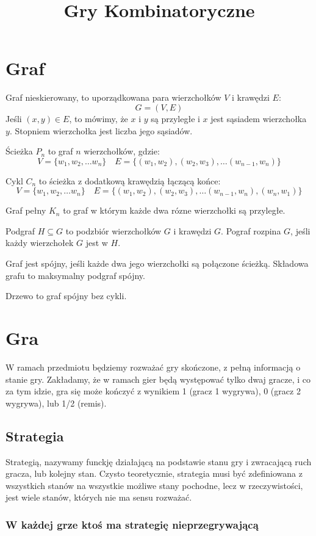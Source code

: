 \documentclass{../notatki}
\title{Gry Kombinatoryczne}
\begin{document}
\section{Graf}

Graf nieskierowany, to uporządkowana para wierzchołków $V$ i krawędzi $E$:
$$
G = (V, E)
$$
Jeśli $(x, y) \in E$, to mówimy, że $x$ i $y$ są przyległe i $x$ jest sąsiadem
wierzchołka $y$.
Stopniem wierzchołka jest liczba jego sąsiadów.

Ścieżka $P_n$ to graf $n$ wierzchołków, gdzie:
$$
V = \{w_1, w_2, \dots w_n\} \quad E = \{(w_1, w_2), (w_2, w_3), \dots
(w_{n - 1}, w_n)\}
$$

Cykl $C_n$ to ścieżka z dodatkową krawędzią łączącą końce:
$$
V = \{w_1, w_2, \dots w_n\} \quad E = \{(w_1, w_2), (w_2, w_3), \dots
(w_{n - 1}, w_n), (w_n, w_1)\}
$$

Graf pełny $K_n$ to graf w którym każde dwa rózne wierzchołki są przyległe.

Podgraf $H \subseteq G$ to podzbiór wierzchołków $G$ i krawędzi $G$. Pograf
rozpina $G$, jeśli każdy wierzchołek $G$ jest w $H$.

Graf jest spójny, jeśli każde dwa jego wierzchołki są połączone ścieżką.
Składowa grafu to maksymalny podgraf spójny.

Drzewo to graf spójny bez cykli.

\section{Gra}

W ramach przedmiotu będziemy rozważać gry skończone, z pełną informacją o stanie
gry. Zakładamy, że w ramach gier będą występować tylko dwaj gracze, i co za tym
idzie, gra się może kończyć z wynikiem 1 (gracz 1 wygrywa), 0 (gracz 2 wygrywa),
lub 1/2 (remis).

\subsection{Strategia}

Strategią, nazywamy funckję działającą na podstawie stanu gry i zwracającą
ruch gracza, lub kolejny stan. Czysto teoretycznie, strategia musi być
zdefiniowana z wszystkich stanów na wszystkie możliwe stany pochodne, lecz
w rzeczywistości, jest wiele stanów, których nie ma sensu rozważać.

\subsubsection{W każdej grze ktoś ma strategię nieprzegrywającą}
\end{document}
